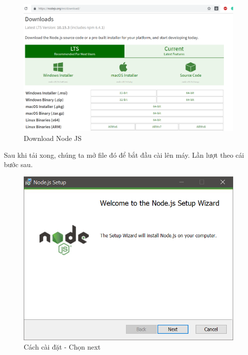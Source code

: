 \documentclass{report}
\begin{document}
\begin{center}
    \begin{figure}[htp]
    \begin{center}
     \includegraphics[scale=.55]{download.png}
    \end{center}
    \caption{Download Node JS}
    \label{refhinh1}
    \end{figure}
\end{center}

Sau khi tải xong, chúng ta mở file đó để bắt đầu cài lên máy. Lần lượt theo cái bước sau.


\begin{center}
    \begin{figure}[htp]
    \begin{center}
     \includegraphics[scale=0.9]{install1.png}
    \end{center}
    \caption{Cách cài đặt - Chọn next}
    \label{refhinh1}
    \end{figure}
\end{center}
\end{document}
